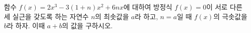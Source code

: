함수 $f(x)=2x^3-3(1+n)x^2+6nx$에 대하여 방정식 $f(x)=0$이 서로 다른 세 실근을 갖도록 하는 자연수 $n$의 최솟값을 $a$라 하고, $n=a$일 때 $f(x)$의 극솟값을 $b$라 하자. 이때 $a+b$의 값을 구하시오.
